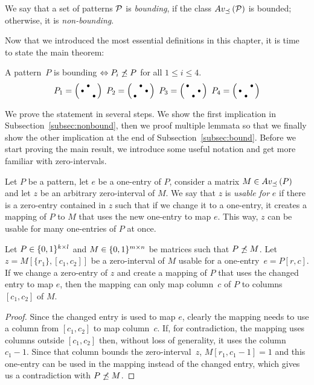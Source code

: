 \begin{defn}
We say that a set of patterns $\mathcal{P}$ is \emph{bounding}, if the class $Av_{\preceq}\left(\mathcal{P}\right)$ is bounded; otherwise, it is \emph{non-bounding}.
\end{defn}

Now that we introduced the most essential definitions in this chapter, it is time to state the main theorem:

\begin{thm}
A pattern~$P$ is bounding $\Leftrightarrow P_i\not\preceq P$ for all $1\leq i\leq4$.
$$P_1=\left(\begin{smallmatrix} &\bullet& \\\bullet& & \\ & &\bullet\end{smallmatrix}\right)\ P_2=\left(\begin{smallmatrix} &\bullet& \\ & &\bullet\\\bullet& & \end{smallmatrix}\right)\ P_3=\left(\begin{smallmatrix}\bullet& & \\ & &\bullet\\ &\bullet& \end{smallmatrix}\right)\ P_4=\left(\begin{smallmatrix} & &\bullet\\\bullet& & \\ &\bullet& \end{smallmatrix}\right)$$
\end{thm}

We prove the statement in several steps. We show the first implication in Subsection~\ref{subsec:nonbound}, then we proof multiple lemmata so that we finally show the other implication at the end of Subsection~\ref{subsec:bound}. Before we start proving the main result, we introduce some useful notation and get more familiar with zero-intervals.

\begin{defn}
Let $P$ be a pattern, let $e$ be a one-entry of $P$, consider a matrix $M\in Av_{\preceq}\left(P\right)$ and let $z$ be an arbitrary zero-interval of $M$. We say that $z$ is \emph{usable for} $e$ if there is a zero-entry contained in $z$ such that if we change it to a one-entry, it creates a mapping of $P$ to $M$ that uses the new one-entry to map $e$. This way, $z$ can be usable for many one-entries of $P$ at once. 
\end{defn}

\begin{obs}
Let $P\in\{0,1\}^{k\times l}$ and $M\in\{0,1\}^{m\times n}$ be matrices such that $P\not\preceq M$. Let $z=M[\{r_1\},[c_1,c_2]]$ be a zero-interval of $M$ usable for a one-entry~$e=P[r,c]$. If we change a zero-entry of $z$ and create a mapping of $P$ that uses the changed entry to map $e$, then the mapping can only map column~$c$ of $P$ to columns $[c_1,c_2]$ of $M$. 
\end{obs}
\begin{proof}
Since the changed entry is used to map $e$, clearly the mapping needs to use a column from $[c_1,c_2]$ to map column~$c$. If, for contradiction, the mapping uses columns outside $[c_1,c_2]$ then, without loss of generality, it uses the column $c_1-1$. Since that column bounds the zero-interval~$z$, $M[r_1,c_1-1]=1$ and this one-entry can be used in the mapping instead of the changed entry, which gives us a contradiction with $P\not\preceq M$.
\end{proof}


